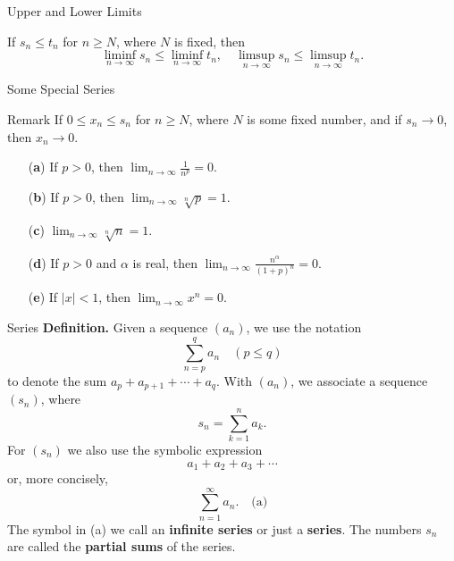 \documentclass{beamer}
\begin{document}
\begin{frame}{Upper and Lower Limits} 

\begin{theorem}
If $s_n \leq t_n$ for $n \geq N$, where $N$ is fixed, then
\[
\liminf_{n \to \infty} s_n \leq \liminf_{n \to \infty} t_n, \quad
\limsup_{n \to \infty} s_n \leq \limsup_{n \to \infty} t_n.
\]
\end{theorem}
\end{frame}


\begin{frame}{Some Special Series}
  \begin{block}{Remark}
    If $0 \leq x_n \leq s_n$ for $n \geq N$, where $N$ is some fixed number, and
    if $s_n \to 0$, then $x_n \to 0$.
  \end{block}
  \begin{theorem}
\begin{enumerate}
    \item[(\textbf{a})] If $p > 0$, then $\lim_{n \to \infty} \frac{1}{n^p} =
    0$.
    \item[(\textbf{b})] If $p > 0$, then $\lim_{n \to \infty} \sqrt[n]{p} = 1$.
    \item[(\textbf{c})] $\lim_{n \to \infty} \sqrt[n]{n} = 1$.
    \item[(\textbf{d})] If $p > 0$ and $\alpha$ is real, then $\lim_{n \to
    \infty} \frac{n^\alpha}{(1 + p)^n} = 0$.
    \item[(\textbf{e})] If $|x| < 1$, then $\lim_{n \to \infty} x^n = 0$.
\end{enumerate}
\end{theorem}
\end{frame}

\begin{frame}{Series}
  \textbf{Definition.} Given a sequence $(a_n)$, we use the notation
\[
\sum_{n=p}^{q} a_n \quad (p \leq q)
\]
to denote the sum $a_p + a_{p+1} + \cdots + a_q$. With $(a_n)$, we associate a
sequence $(s_n)$, where
\[
s_n = \sum_{k=1}^{n} a_k.
\]
For $(s_n)$ we also use the symbolic expression
\[
a_1 + a_2 + a_3 + \cdots
\]
or, more concisely,
\[
\sum_{n=1}^{\infty} a_n. \quad \text{(a)}
\]
The symbol in (a) we call an \textbf{infinite series} or just a \textbf{series}.
The numbers $s_n$ are called the \textbf{partial sums} of the series.
\end{frame}
\end{document}
